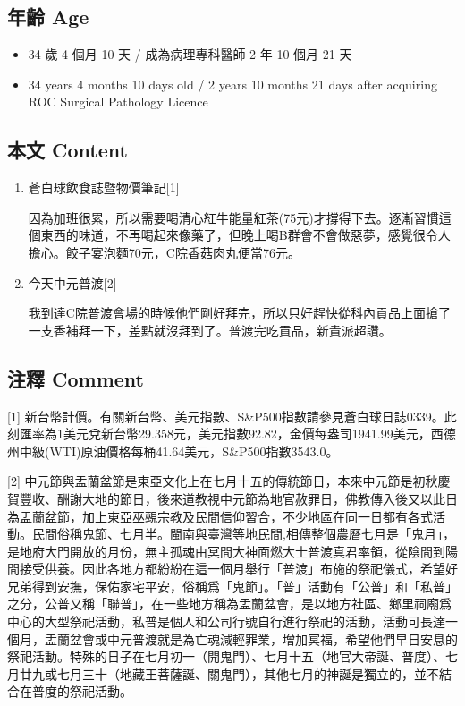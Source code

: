 \documentclass[a5paper, 11pt
]{book}
\providecommand{\tightlist}{%
  \setlength{\itemsep}{0pt}\setlength{\parskip}{0pt}}
\begin{document}
\hypertarget{ux5e74ux9f61-age-1}{%
\subsection{年齡 Age}\label{ux5e74ux9f61-age-1}}

\begin{itemize}
\tightlist
\item
  34 歲 4 個月 10 天 / 成為病理專科醫師 2 年 10 個月 21 天
\item
  34 years 4 months 10 days old / 2 years 10 months 21 days after
  acquiring ROC Surgical Pathology Licence
\end{itemize}

\hypertarget{ux672cux6587-content-1}{%
\subsection{本文 Content}\label{ux672cux6587-content-1}}

\begin{enumerate}
\def\labelenumi{\arabic{enumi}.}
\item
  蒼白球飲食誌暨物價筆記{[}1{]}

  因為加班很累，所以需要喝清心紅牛能量紅茶(75元)才撐得下去。逐漸習慣這個東西的味道，不再喝起來像藥了，但晚上喝B群會不會做惡夢，感覺很令人擔心。餃子宴泡麵70元，C院香菇肉丸便當76元。
\item
  今天中元普渡{[}2{]}

  我到達C院普渡會場的時候他們剛好拜完，所以只好趕快從科內貢品上面搶了一支香補拜一下，差點就沒拜到了。普渡完吃貢品，新貴派超讚。
\end{enumerate}

\hypertarget{ux6ce8ux91cb-comment-1}{%
\subsection{注釋 Comment}\label{ux6ce8ux91cb-comment-1}}

{[}1{]}
新台幣計價。有關新台幣、美元指數、S\&P500指數請參見蒼白球日誌0339。此刻匯率為1美元兌新台幣29.358元，美元指數92.82，金價每盎司1941.99美元，西德州中級(WTI)原油價格每桶41.64美元，S\&P500指數3543.0。

{[}2{]}
中元節與盂蘭盆節是東亞文化上在七月十五的傳統節日，本來中元節是初秋慶賀豐收、酬謝大地的節日，後來道教視中元節為地官赦罪日，佛教傳入後又以此日為盂蘭盆節，加上東亞巫覡宗教及民間信仰習合，不少地區在同一日都有各式活動。民間俗稱鬼節、七月半。閩南與臺灣等地民間,相傳整個農曆七月是「鬼月」，是地府大門開放的月份，無主孤魂由冥間大神面燃大士普渡真君率領，從陰間到陽間接受供養。因此各地方都紛紛在這一個月舉行「普渡」布施的祭祀儀式，希望好兄弟得到安撫，保佑家宅平安，俗稱爲「鬼節」。「普」活動有「公普」和「私普」之分，公普又稱「聯普」，在一些地方稱為盂蘭盆會，是以地方社區、鄉里祠廟爲中心的大型祭祀活動，私普是個人和公司行號自行進行祭祀的活動，活動可長達一個月，盂蘭盆會或中元普渡就是為亡魂減輕罪業，增加冥福，希望他們早日安息的祭祀活動。特殊的日子在七月初一（開鬼門）、七月十五（地官大帝誕、普度）、七月廿九或七月三十（地藏王菩薩誕、關鬼門），其他七月的神誕是獨立的，並不結合在普度的祭祀活動。
\end{document}
